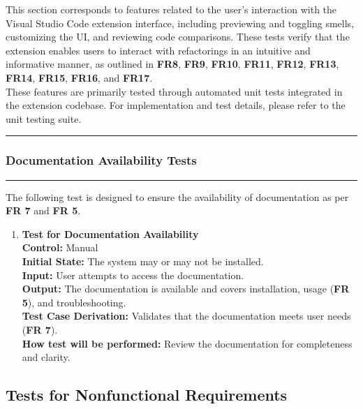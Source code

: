\documentclass[12pt, titlepage]{article}
\newcommand{\colorrule}{\textcolor{BlueViolet}{\rule{\linewidth}{2pt}}}
\begin{document}
\medskip

\noindent
This section corresponds to features related to the user’s interaction with the Visual Studio Code extension interface, including previewing and toggling smells, customizing the UI, and reviewing code comparisons. These tests verify that the extension enables users to interact with refactorings in an intuitive and informative manner, as outlined in \textbf{FR8}, \textbf{FR9}, \textbf{FR10}, \textbf{FR11}, \textbf{FR12}, \textbf{FR13}, \textbf{FR14}, \textbf{FR15}, \textbf{FR16}, and \textbf{FR17}.\\

\noindent These features are primarily tested through automated unit tests integrated in the extension codebase. For implementation and test details, please refer to the unit testing suite.

\noindent\colorrule

\subsubsection{Documentation Availability Tests}
\colorrule

\medskip

\noindent
The following test is designed to ensure the availability of
documentation as per \textbf{FR 7} and \textbf{FR 5}.

\begin{enumerate}[label={\bf
    \textcolor{Maroon}{test-FR-DA-\arabic*}}, wide=0pt, font=\itshape]
  \item \textbf{Test for Documentation Availability}\\[2mm]
    \textbf{Control:} Manual\\
    \textbf{Initial State:} The system may or may not be installed.\\
    \textbf{Input:} User attempts to access the documentation.\\
    \textbf{Output:} The documentation is available and covers
    installation, usage (\textbf{FR 5}), and troubleshooting.\\[2mm]
    \textbf{Test Case Derivation:} Validates that the documentation
    meets user needs (\textbf{FR 7}).\\[2mm]
    \textbf{How test will be performed:} Review the documentation for
    completeness and clarity.
\end{enumerate}

\newpage\subsection{Tests for Nonfunctional Requirements}
\end{document}
